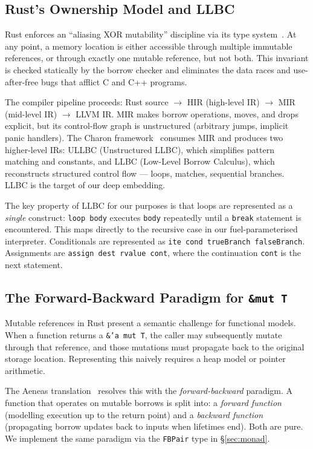 \subsection{Rust's Ownership Model and LLBC}

Rust enforces an ``aliasing XOR mutability'' discipline via its type
system~\cite{rustOwnership2014}. At any point, a memory location is either
accessible through multiple immutable references, or through exactly one mutable
reference, but not both. This invariant is checked statically by the borrow
checker and eliminates the data races and use-after-free bugs that afflict C and
C++ programs.

The compiler pipeline proceeds: Rust source $\to$ HIR (high-level IR)
$\to$ MIR (mid-level IR) $\to$ LLVM IR. MIR makes borrow operations, moves,
and drops explicit, but its control-flow graph is unstructured (arbitrary jumps,
implicit panic handlers). The Charon framework~\cite{charon2024} consumes MIR
and produces two higher-level IRs: ULLBC (Unstructured LLBC), which simplifies
pattern matching and constants, and LLBC (Low-Level Borrow Calculus), which
reconstructs structured control flow — loops, matches, sequential branches.
LLBC is the target of our deep embedding.

The key property of LLBC for our purposes is that loops are represented as
a \emph{single} construct: \texttt{loop body} executes \texttt{body}
repeatedly until a \texttt{break} statement is encountered. This maps directly
to the recursive case in our fuel-parameterised interpreter. Conditionals are
represented as \texttt{ite cond trueBranch falseBranch}. Assignments are
\texttt{assign dest rvalue cont}, where the continuation \texttt{cont} is the
next statement.

\subsection{The Forward-Backward Paradigm for \texttt{\&mut T}}

Mutable references in Rust present a semantic challenge for functional models.
When a function returns a \texttt{\&'a mut T}, the caller may subsequently
mutate through that reference, and those mutations must propagate back to
the original storage location. Representing this naively requires a heap model
or pointer arithmetic.

The Aeneas translation~\cite{ho2022aeneas} resolves this with the
\emph{forward-backward} paradigm. A function that operates on mutable borrows
is split into: a \emph{forward function} (modelling execution up to the return
point) and a \emph{backward function} (propagating borrow updates back to
inputs when lifetimes end). Both are pure. We implement the same paradigm
via the \texttt{FBPair} type in \S\ref{sec:monad}.

